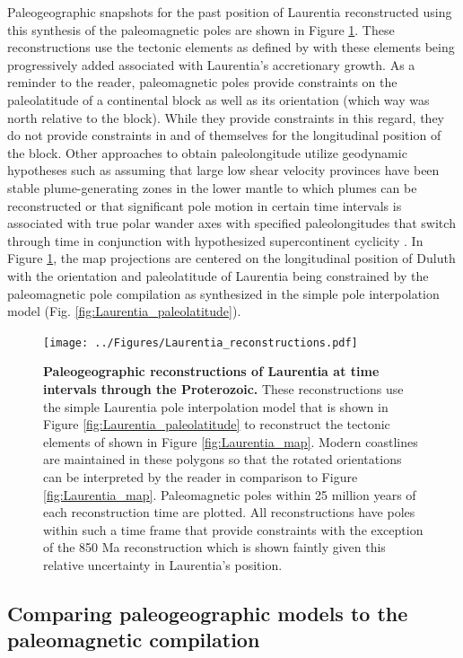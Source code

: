 \documentclass[twocolumn, switch]{article} %
\begin{document}
Paleogeographic snapshots for the past position of Laurentia reconstructed using this synthesis of the paleomagnetic poles are shown in Figure \ref{fig:Laurentia_reconstructions}. These reconstructions use the tectonic elements as defined by \citet{Whitmeyer2007a} with these elements being progressively added associated with Laurentia's accretionary growth. As a reminder to the reader, paleomagnetic poles provide constraints on the paleolatitude of a continental block as well as its orientation (which way was north relative to the block). While they provide constraints in this regard, they do not provide constraints in and of themselves for the longitudinal position of the block. Other approaches to obtain paleolongitude utilize geodynamic hypotheses such as assuming that large low shear velocity provinces have been stable plume-generating zones in the lower mantle to which plumes can be reconstructed \citep{Torsvik2014a} or that significant pole motion in certain time intervals is associated with true polar wander axes with specified paleolongitudes that switch through time in conjunction with hypothesized supercontinent cyclicity \citep{Mitchell2012a}. In Figure \ref{fig:Laurentia_reconstructions}, the map projections are centered on the longitudinal position of Duluth with the orientation and paleolatitude of Laurentia being constrained by the paleomagnetic pole compilation as synthesized in the simple pole interpolation model (Fig. \ref{fig:Laurentia_paleolatitude}).

\begin{figure}
\centering
\texttt{[image: ../Figures/Laurentia\_reconstructions.pdf]}
\caption{\textbf{Paleogeographic reconstructions of Laurentia at time intervals through the Proterozoic.} These reconstructions use the simple Laurentia pole interpolation model that is shown in Figure \ref{fig:Laurentia_paleolatitude} to reconstruct the tectonic elements of \cite{Whitmeyer2007a} shown in Figure \ref{fig:Laurentia_map}. Modern coastlines are maintained in these polygons so that the rotated orientations can be interpreted by the reader in comparison to Figure \ref{fig:Laurentia_map}. Paleomagnetic poles within 25 million years of each reconstruction time are plotted. All reconstructions have poles within such a time frame that provide constraints with the exception of the 850 Ma reconstruction which is shown faintly given this relative uncertainty in Laurentia's position.}
\label{fig:Laurentia_reconstructions}
\end{figure}

\subsection{Comparing paleogeographic models to the paleomagnetic compilation}
\end{document}
